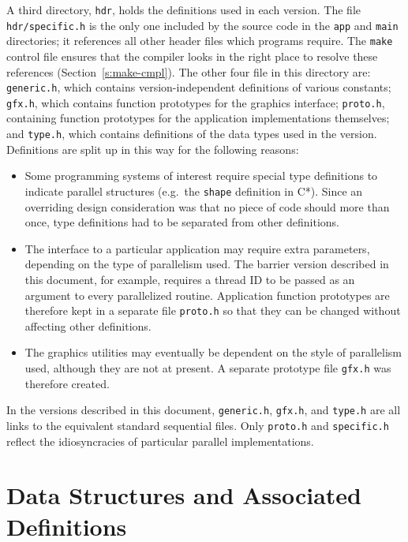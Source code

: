A third directory,
{\tt{hdr}},
holds the definitions used in each version.
The file {\tt{hdr/specific.h}} is the only one
included by the source code in the {\tt{app}} and {\tt{main}} directories;
it references all other header files which programs require.
The {\tt{make}} control file ensures that
the compiler looks in the right place to resolve these references
(Section~\ref{s:make-cmpl}).
The other four file in this directory are:
{\tt{generic.h}},
which contains version-independent definitions of various constants;
{\tt{gfx.h}},
which contains function prototypes for the graphics interface;
{\tt{proto.h}},
containing function prototypes for the application implementations themselves;
and {\tt{type.h}},
which contains definitions of the data types used in the version.
Definitions are split up in this way for the following reasons:
\begin{itemize}
\item	Some programming systems of interest
	require special type definitions to indicate parallel structures
	(e.g.\ the {\tt{shape}} definition in C*).
	Since an overriding design consideration was that
	no piece of code should more than once,
	type definitions had to be separated from other definitions.
\item	The interface to a particular application
	may require extra parameters,
	depending on the type of parallelism used.
	The barrier version described in this document,
	for example,
	requires a thread ID to be passed as an argument
	to every parallelized routine.
	Application function prototypes are therefore kept in a separate file
	{\tt{proto.h}}
	so that they can be changed without affecting other definitions.
\item	The graphics utilities may eventually be dependent on
	the style of parallelism used,
	although they are not at present.
	A separate prototype file {\tt{gfx.h}} was therefore created.
\end{itemize}
In the versions described in this document,
{\tt{generic.h}},
{\tt{gfx.h}},
and {\tt{type.h}} are all links to
the equivalent standard sequential files.
Only {\tt{proto.h}} and {\tt{specific.h}} reflect
the idiosyncracies of particular parallel implementations.

\section{Data Structures and Associated Definitions\label{s:defs}}

